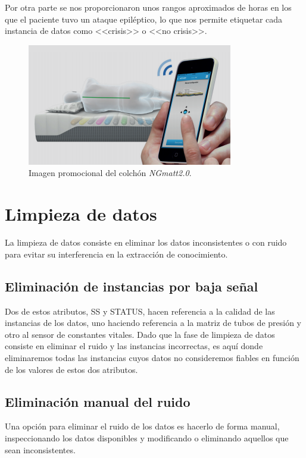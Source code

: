 Por otra parte se nos proporcionaron unos rangos aproximados de horas en los que el paciente tuvo un ataque epiléptico, lo que nos permite etiquetar cada instancia de datos como <<crisis>> o <<no crisis>>.  

\begin{figure}[H]
	\centering
	\includegraphics[width=0.8\textwidth]{../img/ngmatt.png}
	\caption{Imagen promocional del colchón \textit{NGmatt2.0}.}
	\label{fig:ngmatt}
\end{figure}

\section{Limpieza de datos}

La limpieza de datos consiste en eliminar los datos inconsistentes o con ruido para evitar su interferencia en la extracción de conocimiento. 

\subsection{Eliminación de instancias por baja señal}

Dos de estos atributos, SS y STATUS, hacen referencia a la calidad de las instancias de los datos, uno haciendo referencia a la matriz de tubos de presión y otro al sensor de constantes vitales. Dado que la fase de limpieza de datos consiste en eliminar el ruido y las instancias incorrectas, es aquí donde eliminaremos todas las instancias cuyos datos no consideremos fiables en función de los valores de estos dos atributos. 

\subsection{Eliminación manual del ruido}

Una opción para eliminar el ruido de los datos es hacerlo de forma manual, inspeccionando los datos disponibles y modificando o eliminando aquellos que sean inconsistentes.  


